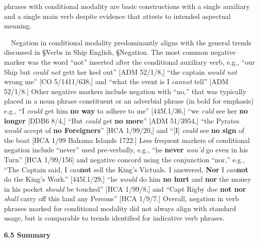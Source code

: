 \begin{styleStandard}
phrases with conditional modality are basic constructions with a single auxiliary and a single main verb despite evidence that attests to intended aspectual meaning. 
\end{styleStandard}

\begin{styleStandard}
\ \ Negation in conditional modality predominantly aligns with the general trends discussed in §Verbs in Ship English, §Negation. The most common negative marker was the word “not” inserted after the conditional auxiliary verb, e.g., “our Ship but \textit{could not} gett her keel out” [ADM 52/1/8,] “the captain \textit{would not} wrong me” [CO 5/1411/638,] and “what the event is I \textit{cannot} tell” [ADM 52/1/8.] Other negative markers include negation with “no,” that was typically placed in a noun phrase constituent or an adverbial phrase (in bold for emphasis) e.g., “I \textit{could }get him \textbf{no way} to adhere to me” [445f.1/36,] “we \textit{culd }see her \textbf{no longer}{\textquotedbl} [DDB6 8/4,] “But \textit{could} get \textbf{no more}” [ADM 51/3954,] “the Pyrates \textit{would} accept of \textbf{no Foreigners}” [HCA 1/99/20,] and “[I] \textit{could} see \textbf{no sign} of the boat{\textquotedbl} [HCA 1/99 Bahama Islands 1722.] Less frequent markers of conditional negation include “never” used pre-verbally, e.g., “he \textbf{never} \textit{wou’d} go even in his Turn” [HCA 1/99/156] and negative concord using the conjunction “nor,” e.g., “The Captain said, I \textit{can}\textbf{not} sell the King’s Victuals. I answered, \textbf{Nor} I \textit{can}\textbf{not} do the King’s Work.” [445f.1/29,] “he \textit{would} do him \textbf{no hurt} and \textbf{nor} the money in his pocket \textit{should} be touched” [HCA 1/99/8,] and “Capt Rigby doe \textbf{not nor} \textit{shall} carry off this land any Persons” [HCA 1/9/7.] Overall, negation in verb phrases marked for conditional modality did not always align with standard usage, but is comparable to trends identified for indicative verb phrases. 
\end{styleStandard}

\begin{styleStandard}
\textbf{6.5 Summary}
\end{styleStandard}

